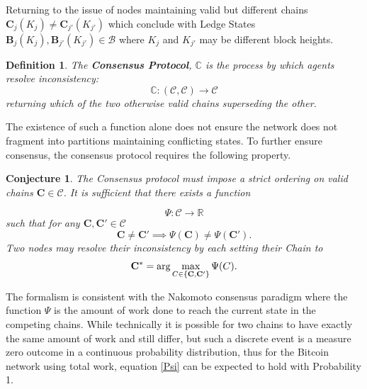 \documentclass[letterpaper, 10 pt, conference]{ieeeconf}  %
\newtheorem{definition}{Definition}
\newtheorem{conjecture}{Conjecture}
\begin{document}
Returning to the issue of nodes maintaining valid but different chains $\mathbf{C}_j(K_j) \neq \mathbf{C}_{j'}(K_{j'})$ which conclude with Ledge States $\mathbf{B}_j(K_j), \mathbf{B}_{j'}(K_{j'}) \in \mathcal{B}$ where $K_j$ and $K_{j'}$ may be different block heights.

\begin{definition} The \textbf{Consensus Protocol}, $\mathbb{C}$ is the process by which agents resolve inconsistency:
\begin{equation}
\mathbb{C}: (\mathcal{C}, \mathcal{C}) \rightarrow \mathcal{C}
\end{equation}
returning which of the two otherwise valid chains superseding the other.
\end{definition}

The existence of such a function alone does not ensure the network does not fragment into partitions maintaining conflicting states. To further ensure consensus, the consensus protocol requires the following property.

\begin{conjecture}\label{Consensus}
The Consensus protocol must impose a strict ordering on valid chains $\mathbf{C}\in \mathcal{C}$. It is sufficient that there exists a function 

\begin{equation} 
    \Psi: \mathcal{C}\rightarrow \mathbb{R}
\end{equation}
such that for any $\mathbf{C},\mathbf{C}'\in \mathcal{C}$
\begin{equation}
     \mathbf{C}\neq \mathbf{C}' \implies \Psi(\mathbf{C}) \neq \Psi(\mathbf{C}'). \label{Psi}
\end{equation}
Two nodes may resolve their inconsistency by each setting their Chain to 
\begin{equation}
 \mathbf{C}^* = \hbox{arg}\max_{C\in\{\mathbf{C}, \mathbf{C}'\}} \Psi(C).
\end{equation}
\end{conjecture}

The formalism is consistent with the Nakomoto consensus paradigm where the function $\Psi$ is the amount of work done to reach the current state in the competing chains. While technically it is possible for two chains to have exactly the same amount of work and still differ, but such a discrete event is a measure zero outcome in a continuous probability distribution, thus for the Bitcoin network using total work, equation \eqref{Psi} can be expected to hold with Probability 1.
\end{document}
